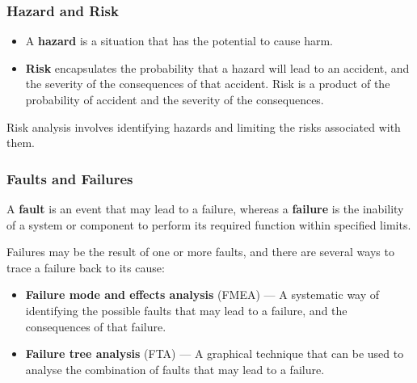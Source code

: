 \documentclass{article}
\begin{document}
\subsubsection{Hazard and Risk}
\begin{itemize}
    \item A \textbf{hazard} is a situation that has the potential to
          cause harm.
    \item \textbf{Risk} encapsulates the probability that a hazard
          will lead to an accident, and the severity of the consequences
          of that accident. Risk is a product of the probability of
          accident and the severity of the consequences.
\end{itemize}
Risk analysis involves identifying hazards and limiting the risks
associated with them.
\subsubsection{Faults and Failures}
A \textbf{fault} is an event that may lead to a failure, whereas a
\textbf{failure} is the inability of a system or component to perform
its required function within specified limits.

Failures may be the result of one or more faults, and there are several
ways to trace a failure back to its cause:
\begin{itemize}
    \item \textbf{Failure mode and effects analysis} (FMEA) --- A
          systematic way of identifying the possible faults that may
          lead to a failure, and the consequences of that failure.
    \item \textbf{Failure tree analysis} (FTA) --- A graphical technique
          that can be used to analyse the combination of faults that may
          lead to a failure.
\end{itemize}
\end{document}
